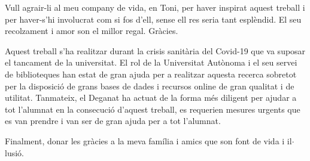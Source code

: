 \documentclass[12pt]{article}
\renewcommand{\_}{\kern-1.5pt\textunderscore\kern-1.5pt}
\begin{document}
\begin{Center}

\end{Center}\par


\vspace{\baselineskip}

\vspace{\baselineskip}

\vspace{\baselineskip}
\begin{justify}

\end{justify}\par


\vspace{\baselineskip}
\begin{justify}
Vull agrair-li al meu company de vida, en Toni, per haver inspirat aquest treball i per haver-s’hi involucrat com si fos d’ell, sense ell res seria tant esplèndid. El seu recolzament i amor son el millor regal. Gràcies. 
\end{justify}\par


\vspace{\baselineskip}
\begin{justify}
Aquest treball s’ha realitzar durant la crisis sanitària del Covid-19 que va suposar el tancament de la universitat. El rol de la Universitat Autònoma i el seu servei de biblioteques han estat de gran ajuda per a realitzar aquesta recerca sobretot per  la disposició de grans bases de dades i recursos online de gran qualitat i de utilitat. Tanmateix, el Deganat ha actuat de la forma més diligent per ajudar a tot l’alumnat en la consecució d’aquest treball, es requerien mesures urgents que es van prendre i van ser de gran ajuda per a tot l’alumnat. 
\end{justify}\par


\vspace{\baselineskip}
\begin{justify}
Finalment, donar les gràcies a la meva família i amics que son font de vida i il$ \cdot $ lusió.
\end{justify}\par


\vspace{\baselineskip}

\vspace{\baselineskip}
\end{document}
